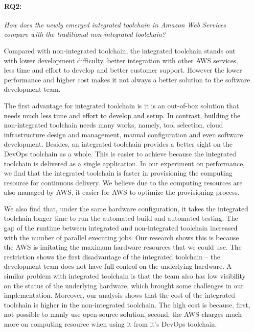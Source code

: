 \paragraph{RQ2:} \textit{How does the newly emerged integrated toolchain in Amazon Web Services compare with the traditional non-integrated toolchain?}
\medskip
\par
Compared with non-integrated toolchain, the integrated toolchain stands out with lower development difficulty, better integration with other AWS services, less time and effort to develop and better customer support. However the lower performance and higher cost makes it not always a better solution to the software development team.
\par
The first advantage for integrated toolchain is it is an out-of-box solution that needs much less time and effort to develop and setup. In contrast, building the non-integrated toolchain needs many works, namely, tool selection, cloud infrastructure design and management, manual configuration and even software development. Besides, an integrated toolchain provides a better sight on the DevOps toolchain as a whole. This is easier to achieve because the integrated toolchain is delivered as a single application. In our experiment on performance, we find that the integrated toolchain is faster in provisioning the computing resource for continuous delivery. We believe due to the computing resources are also managed by AWS, it easier for AWS to optimize the provisioning process.
\par
We also find that, under the same hardware configuration, it takes the integrated toolchain longer time to run the automated build and automated testing. The gap of the runtime between integrated and non-integrated toolchain increased with the number of parallel executing jobs.
Our research shows this is because the AWS is imitating the maximum hardware resources that we could use. The restriction shows the first disadvantage of the integrated toolchain -- the development team does not have full control on the underlying hardware. A similar problem with integrated toolchain is that the team also has low visibility on the status of the underlying hardware, which brought some challenges in our implementation. Moreover, our analysis shows that the cost of the integrated toolchain is higher in the non-integrated toolchain. The high cost is because, first, not possible to manly use open-source solution, second, the AWS charges much more on computing resource when using it from it's DevOps toolchain.
